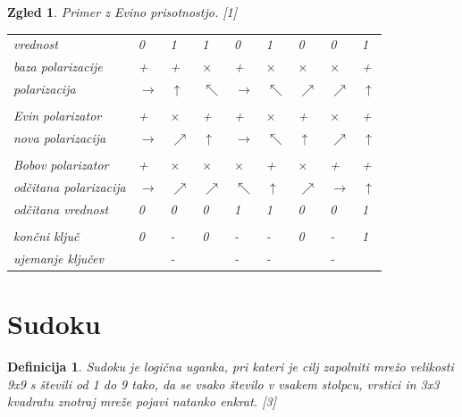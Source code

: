\documentclass[A4paper, 11pt]{article}
\newtheorem{definicija}{Definicija}
\newtheorem{zgled}{Zgled}
\newcommand{\cmark}{\ding{51}}
\newcommand{\xmark}{\ding{55}}
\begin{document}
\begin{zgled} 
Primer z Evino prisotnostjo. [1]

\begin{center}
\begin{tabular}{ l m{0.3 cm} m{0.3 cm} m{0.3 cm} m{0.3 cm} m{0.3 cm} m{0.3 cm} m{0.3 cm} m{0.3 cm}}
vrednost & 0 & 1 & 1 & 0 & 1 & 0 & 0 & 1\\
baza polarizacije & + & + & $\times$ & + & $\times$ & $\times$ & $\times$ & + \\
polarizacija & $\rightarrow$ & $\uparrow$ & $\nwarrow$ & $\rightarrow$ & $\nwarrow$ & $\nearrow$ & $\nearrow$  & $\uparrow$\\
\\
Evin polarizator & + & $\times$ & + & + & $\times$ & + & $\times$ & +\\
nova polarizacija & $\rightarrow$ & $\nearrow$ & $\uparrow$ & $\rightarrow$ & $\nwarrow$  & $\uparrow$ & $\nearrow$ & $\uparrow$\\
\\
Bobov polarizator & + & $\times$ & $\times$ & $\times$ & + & $\times$ & + & +\\
odčitana polarizacija & $\rightarrow$ & $\nearrow$ & $\nearrow$ & $\nwarrow$ & $\uparrow$  & $\nearrow$ & $\rightarrow$ & $\uparrow$\\
odčitana vrednost & 0 & 0 & 0 & 1 & 1 & 0 & 0 & 1\\
\\
končni ključ & 0 & - & 0 & - & - & 0 & - & 1\\
ujemanje ključev & \cmark & - & \xmark & - & - & \cmark & - & \cmark\\ 
\end{tabular}
\end{center}

\end{zgled}

\pagebreak



\section{Sudoku}

\begin{definicija}
Sudoku je logična uganka, pri kateri je cilj zapolniti mrežo velikosti 9x9 s števili od 1 do 9 tako, da se vsako število v vsakem stolpcu, vrstici in 3x3 kvadratu znotraj mreže pojavi natanko enkrat. [3]
\end{definicija}
\end{document}
